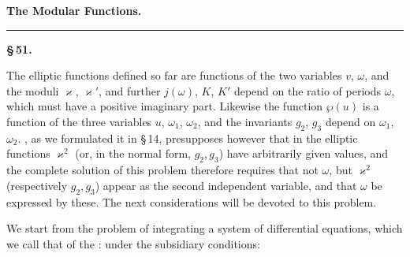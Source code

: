 \begin{center}

\textbf{The Modular Functions.}

\rule{2cm}{0.4pt}

\textbf{\S\,51. }
\end{center}

The elliptic functions defined so far are functions of the two variables $v$, $\omega$, and the moduli $\varkappa$, $\varkappa'$, and further $j(\omega)$, $K$, $K'$ depend on the ratio of periods $\omega$, which must have a positive imaginary part. Likewise the function $\wp(u)$ is a function of the three variables $u$, $\omega_1$, $\omega_2$, and the invariants $g_2$, $g_3$ depend on $\omega_1$, $\omega_2$. , as we formulated it in \S\,14, presupposes however that in the elliptic functions $\varkappa^2$ (or, in the  normal form, $g_2, g_3$) have arbitrarily given values, and the complete solution of this problem therefore requires that not $\omega$, but $\varkappa^2$ (respectively $g_2, g_3$) appear as the second independent variable, and that $\omega$ be expressed by these. The next considerations will be devoted to this problem.

We start from the problem of integrating a system of differential equations, which we call that of the :
under the subsidiary conditions:

